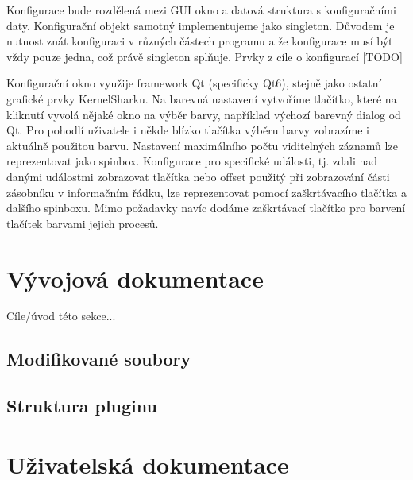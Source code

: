 Konfigurace bude rozdělená mezi GUI okno a datová struktura s konfiguračními daty. Konfigurační objekt samotný implementujeme jako singleton. Důvodem je nutnost znát konfiguraci v různých částech programu a že konfigurace musí být vždy pouze jedna, což právě singleton splňuje. Prvky z cíle o konfigurací [TODO]

Konfigurační okno využije framework Qt (specificky Qt6), stejně jako ostatní grafické prvky KernelSharku. Na barevná nastavení vytvoříme tlačítko, které na kliknutí vyvolá nějaké okno na výběr barvy, například výchozí barevný dialog od Qt. Pro pohodlí uživatele i někde blízko tlačítka výběru barvy zobrazíme i aktuálně použitou barvu. Nastavení maximálního počtu viditelných záznamů lze reprezentovat jako spinbox. Konfigurace pro specifické události, tj. zdali nad danými událostmi zobrazovat tlačítka nebo offset použitý při zobrazování části zásobníku v informačním řádku, lze reprezentovat pomocí zaškrtávacího tlačítka a dalšího spinboxu. Mimo požadavky navíc dodáme zaškrtávací tlačítko pro barvení tlačítek barvami jejich procesů.

\section{Vývojová dokumentace}
Cíle/úvod této sekce...

\subsection{Modifikované soubory}

\subsection{Struktura pluginu}

\section{Uživatelská dokumentace}

